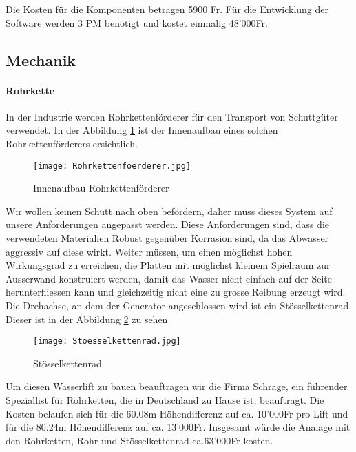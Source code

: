 Die Kosten für die Komponenten betragen 5900 \si{Fr}. Für die Entwicklung der Software werden 3 PM benötigt und kostet einmalig 48'000\si{Fr}. 

\newpage


\subsection{Mechanik}

\paragraph{Rohrkette}

In der Industrie werden Rohrkettenförderer für den Transport von Schuttgüter verwendet. In der Abbildung \ref{fig:Rohrkettenfoerderer}  ist der Innenaufbau eines solchen Rohrkettenförderers ersichtlich.

\begin{figure} [H]
	\centering
	\texttt{[image: Rohrkettenfoerderer.jpg]}
	\caption{Innenaufbau Rohrkettenförderer \cite{abconvey}}
	\label{fig:Rohrkettenfoerderer}
\end{figure}

Wir wollen keinen Schutt nach oben befördern, daher muss dieses System auf unsere Anforderungen angepasst werden. Diese Anforderungen sind, dass die verwendeten Materialien Robust gegenüber Korrasion sind, da das Abwasser aggressiv auf diese wirkt. Weiter müssen, um einen möglichst hohen Wirkungsgrad zu erreichen, die Platten mit möglichst kleinem Spielraum zur Ausserwand konstruiert werden, damit das Wasser nicht einfach auf der Seite herunterfliessen kann und gleichzeitig nicht eine zu grosse Reibung erzeugt wird. Die Drehachse, an dem der Generator angeschlossen wird ist ein Stösselkettenrad. Dieser ist in der Abbildung \ref{fig:stoesselkettenrad}  zu sehen

\begin{figure} [H]
	\centering
	\texttt{[image: Stoesselkettenrad.jpg]}
	\caption{Stösselkettenrad \cite{schrage}}
	\label{fig:stoesselkettenrad}
\end{figure}


Um diesen Wasserlift zu bauen beauftragen wir die Firma Schrage, ein führender Speziallist für Rohrketten, die in Deutschland zu Hause ist, beauftragt. Die Kosten belaufen sich für die 60.08\si{m} Höhendifferenz auf ca. 10'000\si{Fr} pro Lift und für die 80.24\si{m} Höhendifferenz auf ca. 13'000\si{Fr}. Insgesamt würde die Analage mit den Rohrketten, Rohr und Stösselkettenrad ca.63'000\si{Fr} kosten. \cite{schrage}

